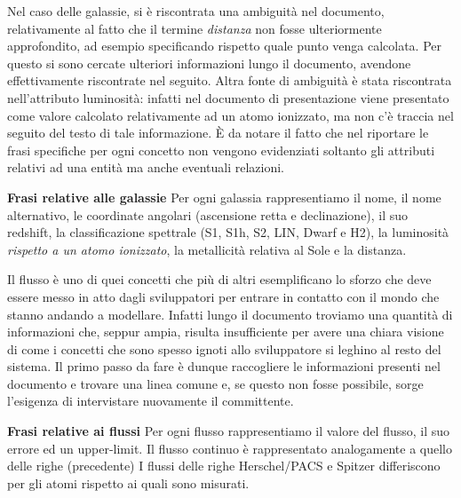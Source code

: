 \documentclass[12pt,a4paper,onecolumn]{article}
\begin{document}
	\begin{flushleft}
		Nel caso delle galassie, si è riscontrata una ambiguità nel documento, relativamente al fatto che il termine \textit{distanza} non fosse ulteriormente approfondito, ad esempio specificando rispetto quale punto venga calcolata. Per questo si sono cercate ulteriori informazioni lungo il documento, avendone effettivamente riscontrate nel seguito.\newline
		Altra fonte di ambiguità è stata riscontrata nell'attributo luminosità: infatti nel documento di presentazione viene presentato come valore calcolato relativamente ad un atomo ionizzato, ma non c'è traccia nel seguito del testo di tale informazione.
		È da notare il fatto che nel riportare le frasi specifiche per ogni concetto non vengono evidenziati soltanto gli attributi relativi ad una entità ma anche eventuali relazioni.
		
	\end{flushleft}
	
	\begin{framed}
		\begin{flushleft}
			\textbf{Frasi relative alle galassie}\newline
				Per ogni galassia rappresentiamo il nome, il nome alternativo, le coordinate angolari (ascensione retta e declinazione), il suo redshift, la classificazione spettrale (S1, S1h, S2, LIN, Dwarf e H2), la luminosità \textit{rispetto a un atomo ionizzato}, la metallicità relativa al Sole e la distanza.
		\end{flushleft}
	\end{framed}
	
	\begin{flushleft}
		Il flusso è uno di quei concetti che più di altri esemplificano lo sforzo che deve essere messo in atto dagli sviluppatori per entrare in contatto con il mondo che stanno andando a modellare. Infatti lungo il documento troviamo una quantità di informazioni che, seppur ampia, risulta insufficiente per avere una chiara visione di come i concetti che sono spesso ignoti allo sviluppatore si leghino al resto del sistema. Il primo passo da fare è dunque raccogliere le informazioni presenti nel documento e trovare una linea comune e, se questo non fosse possibile, sorge l'esigenza di intervistare nuovamente il committente.
	\end{flushleft}
	
	\begin{framed}
		\begin{flushleft}
			\textbf{Frasi relative ai flussi}\newline
			Per ogni flusso rappresentiamo il valore del flusso, il suo errore ed un upper-limit.
			Il flusso continuo è rappresentato analogamente a quello delle righe (precedente)
			I flussi delle righe Herschel/PACS e Spitzer differiscono per gli atomi rispetto ai quali sono misurati.
			\newline
		\end{flushleft}
	\end{framed}
	
\end{document}
